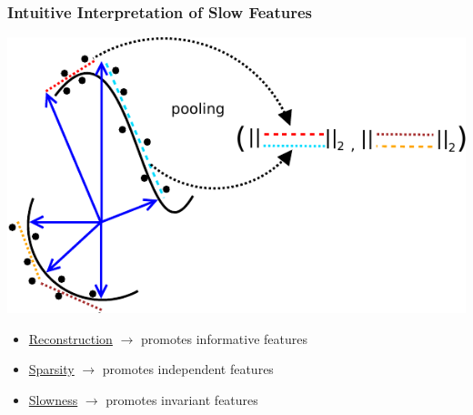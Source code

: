 \documentclass{beamer}
\begin{document}
\begin{frame}
\frametitle{Intuitive Interpretation of Slow Features}
\centering
\includegraphics[scale=0.65]{./Figures/SF2.pdf} \\
\begin{itemize} 
\item{\underline{Reconstruction} $\rightarrow$ promotes informative features}
\item{\underline{Sparsity} $\rightarrow$ promotes independent features}
\item{\underline{Slowness} $\rightarrow$ promotes invariant features}
\end{itemize} 
\end{frame} 
\end{document}
